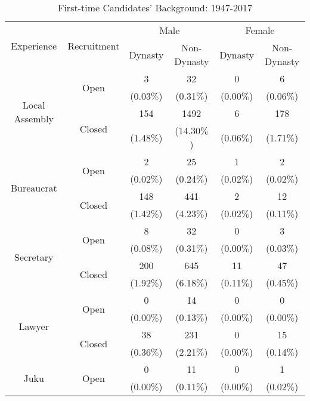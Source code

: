 
\begin{table}[H]
\caption{First-time Candidates' Background: 1947-2017}
\label{table:summaryBackgroundCandidates}
\centering
\begin{threeparttable}
  \begin{tabular}{cccccc} \toprule[1.5pt]
    \multirow{2}{*}{Experience} & \multirow{2}{*}{Recruitment} & \multicolumn{2}{c}{Male} & \multicolumn{2}{c}{Female} \\ \cmidrule{3-6}
    & & Dynasty & Non-Dynasty & Dynasty & Non-Dynasty \\ \midrule
    \multirow{4}{*}{Local Assembly} & \multirow{2}{*}{Open} & 3 & 32 & 0 & 6 \\
    & & (0.03$\%$) & (0.31$\%$) & (0.00$\%$) & (0.06$\%$) \\
    & \multirow{2}{*}{Closed} & 154 & 1492 & 6 & 178 \\
    & & (1.48$\%$) & (14.30$\%$) & (0.06$\%$) & (1.71$\%$) \\ \midrule[0.7pt]
    \multirow{4}{*}{Bureaucrat} & \multirow{2}{*}{Open} & 2 & 25 & 1 & 2 \\
    & & (0.02$\%$) & (0.24$\%$) & (0.02$\%$) & (0.02$\%$) \\
    & \multirow{2}{*}{Closed} & 148 & 441 & 2 & 12 \\
    & & (1.42$\%$) & (4.23$\%$) & (0.02$\%$) & (0.11$\%$) \\ \midrule[0.7pt]
    \multirow{4}{*}{Secretary} & \multirow{2}{*}{Open} & 8 & 32 & 0 & 3 \\
    & & (0.08$\%$) & (0.31$\%$) & (0.00$\%$) & (0.03$\%$) \\
    & \multirow{2}{*}{Closed} & 200 & 645 & 11 & 47 \\
    & & (1.92$\%$) & (6.18$\%$) & (0.11$\%$) & (0.45$\%$) \\ \midrule[0.7pt]
    \multirow{4}{*}{Lawyer} & \multirow{2}{*}{Open} & 0 & 14 & 0 & 0 \\
    & & (0.00$\%$) & (0.13$\%$) & (0.00$\%$) & (0.00$\%$) \\
    & \multirow{2}{*}{Closed} & 38 & 231 & 0 & 15 \\
    & & (0.36$\%$) & (2.21$\%$) & (0.00$\%$) & (0.14$\%$) \\ \midrule[0.7pt]
    \multirow{4}{*}{Juku} & \multirow{2}{*}{Open} & 0 & 11 & 0 & 1 \\
    & & (0.00$\%$) & (0.11$\%$) & (0.00$\%$) & (0.02$\%$) \\ 

\end{tabular}
\end{threeparttable}
\end{table}
